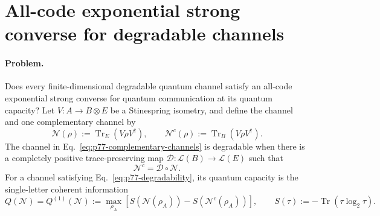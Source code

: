 \section{All-code exponential strong converse for degradable channels}
\label{sec:op_cdad869fc8c3c0ea}

\paragraph{Problem.}
Does every finite-dimensional degradable quantum channel satisfy an all-code
exponential strong converse for quantum communication at its quantum capacity?
Let $V:A\to B\otimes E$ be a Stinespring isometry, and define the channel and
one complementary channel by
\begin{equation}
  \mathcal N(\rho):=\operatorname{Tr}_E(V\rho V^\dagger),
  \qquad
  \mathcal N^c(\rho):=\operatorname{Tr}_B(V\rho V^\dagger).
  \label{eq:p77-complementary-channels}
\end{equation}
The channel in Eq.~\eqref{eq:p77-complementary-channels} is degradable when
there is a completely positive trace-preserving map
$\mathcal D:\mathcal L(B)\to\mathcal L(E)$ such that
\begin{equation}
  \mathcal N^c=\mathcal D\circ\mathcal N.
  \label{eq:p77-degradability}
\end{equation}
For a channel satisfying Eq.~\eqref{eq:p77-degradability}, its quantum
capacity is the single-letter coherent information
\begin{equation}
  Q(\mathcal N)=Q^{(1)}(\mathcal N)
  :=\max_{\rho_A}
    \left[S(\mathcal N(\rho_A))-S(\mathcal N^c(\rho_A))\right],
  \qquad
  S(\tau):=-\operatorname{Tr}(\tau\log_2\tau).
  \label{eq:p77-degradable-capacity}
\end{equation}

